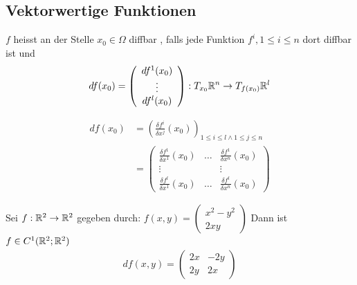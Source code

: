 \documentclass[a4paper]{article}
\begin{document}
	\subsection{Vektorwertige Funktionen}
		\begin{fdef}[Differenzierbarkeit]
			$f$ heisst an der Stelle $x_0 \in \Omega$ diffbar , falls jede Funktion $f^i, 1 \leq i \leq n$ dort diffbar ist und 
				$$df(x_0) = \left( \begin{array}{c}
								df^1 (x_0)\\
								\vdots \\
								df^l (x_0)
								\end{array} \right): T_{x_0}\mathbb{R}^n \rightarrow T_{f(x_0)} \mathbb{R}^l$$
	
		\end{fdef}
	\begin{multicols}{2}
		\begin{fdef}
			\begin{align*}
				df (x_0) &= \left( \frac{\delta f^i}{\delta x^j}(x_0) \right)_{1 \leq i \leq l \land 1 \leq j \leq n} \\
						&= \left( \begin{array}{ccc}
								\frac{\delta f^1}{\delta x^1}(x_0) & \ldots & \frac{\delta f^1}{\delta x^n}(x_0)\\
								\vdots && \vdots \\
									\frac{\delta f^l}{\delta x^1}(x_0) & \ldots & \frac{\delta f^l}{\delta x^n}(x_0)
								\end{array} \right)
			\end{align*}
		\end{fdef}
		\begin{fmerke}

			 Sei $f: \mathbb{R}^2 \rightarrow \mathbb{R}^2$ gegeben durch: $f(x,y) = \left( \begin{array}{c}
																					x^2-y^2\\
																					2xy
																				\end{array} \right)$ Dann ist $f\in C^1 (\mathbb{R}^2; \mathbb{R}^2)$
					\begin{align*}
						df(x,y) = \left( \begin{array}{cc}
										2x & -2y \\
										2y & 2x
										\end{array} \right) 
					\end{align*}


		\end{fmerke}
	\end{multicols}
\end{document}
